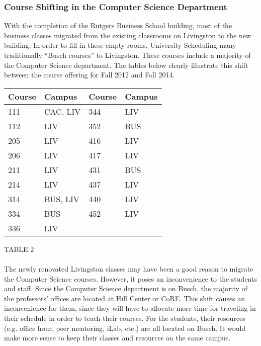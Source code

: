 \documentclass[12pt]{article}
\begin{document}
		\subsubsection{Course Shifting in the Computer Science Department}
			With the completion of the Rutgers Business School building, most of the
			business classes migrated from the existing classrooms on Livingston to the new
			building. In order to fill in these empty rooms, University Scheduling many
			traditionally “Busch courses” to Livingston. These courses include a majority
			of the Computer Science department. The tables below clearly illustrate this
			shift between the course offering for Fall 2012 and Fall 2014.
			
			\begin{center}
				 \label{tab:title} 
				\begin{tabular}{ | l | l | l | l | }
					\hline
					Course & Campus & Course &	Campus \\ \hline
					111 & CAC, LIV & 344 & LIV \\ \hline
					112 & LIV & 352 & BUS \\ \hline
					205 & LIV & 416 & LIV \\ \hline
					206 & LIV & 417 & LIV \\ \hline
					211 & LIV & 431 & BUS \\ \hline
					214 & LIV & 437 & LIV \\ \hline
					314 & BUS, LIV & 440 & LIV \\ \hline
					334 & BUS & 452 & LIV \\ \hline
					336 & LIV & & \\ 
					\hline
				\end{tabular}
			\end{center}
			TABLE 2
			\\\\
			The newly renovated Livingston classes may have been a good reason to migrate
			the Computer Science courses. However, it poses an inconvenience to the
			students and staff. Since the Computer Science department is on Busch, the
			majority of the professors’ offices are located at Hill Center or CoRE. This
			shift causes an inconvenience for them, since they will have to allocate more
			time for traveling in their schedule in order to teach their courses. For the
			students, their resources (e.g. office hour, peer mentoring, iLab, etc.) are
			all located on Busch. It would make more sense to keep their classes and
			resources on the same campus. 
\end{document}
